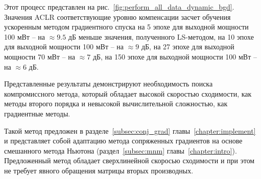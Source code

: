Этот процесс представлен на рис.~\ref{fig:perform_all_data_dynamic_bgd}. Значения ACLR соответствующие уровню компенсации засчет обучения ускоренным методом градиентного спуска на 5 эпохе для выходной мощности 100 мВт -- на $\approx9.5$ дБ меньше значения, полученного LS-методом, на 10 эпохе для выходной мощности 100 мВт -- на $\approx9$ дБ, на 27 эпохе для выходной мощности 70 мВт -- на $\approx7$ дБ, на 150 эпохе для выходной мощности 100 мВт -- на $\approx6$ дБ.

Представленные результаты демонстрируют необходимость поиска компромиссного метода, который обладает высокой скоростью сходимости, как методы второго порядка и невысокой вычислительной сложностью, как градиентные методы. 

Такой метод предложен в разделе~\ref{subsec:conj_grad} главы~\ref{chapter:implement} и представляет собой адаптацию метода сопряженных градиентов на основе смешанного метода Ньютона (раздел~\ref{subsec:mnm} главы~\ref{chapter:intro}). Предложенный метод обладает сверхлинейной скоросью сходимости и при этом не требует явного обращения матрицы вторых производных.



